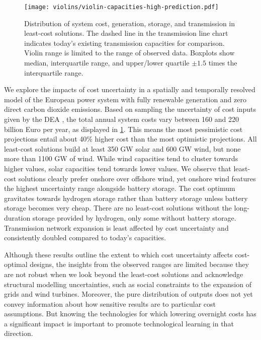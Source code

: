 
\begin{figure}
    \centering
    \texttt{[image: violins/violin-capacities-high-prediction.pdf]}
    \caption{
      Distribution of system cost, generation, storage, and transmission
      in least-cost solutions. The dashed line in the
      transmission line chart indicates today's existing transmission
      capacities for comparison. Violin range is limited to the range of observed data.
      Boxplots show median, interquartile range, and upper/lower quartile $\pm 1.5$ times the interquartile range.
    }
    \label{fig:violin}
\end{figure}

We explore the impacts of cost uncertainty in a spatially and temporally
resolved model of the European power system with fully renewable generation and
zero direct carbon dioxide emissions. Based on sampling the uncertainty of cost
inputs given by the DEA \cite{DEA}, the total annual system costs vary between
160 and 220 billion Euro per year, as displayed in \cref{fig:violin}. This means
the most pessimistic cost projections entail about 40\% higher cost than the
most optimistic projections. All least-cost solutions build at least 350 GW
solar and 600 GW wind, but none more than 1100 GW of wind. While wind capacities
tend to cluster towards higher values, solar capacities tend towards lower
values. We observe that least-cost solutions clearly prefer onshore over
offshore wind, yet onshore wind features the highest uncertainty range alongside
battery storage. The cost optimum gravitates towards hydrogen storage rather
than battery storage unless battery storage becomes very cheap. There are no
least-cost solutions without the long-duration storage provided by hydrogen,
only some without battery storage. Transmission network expansion is least
affected by cost uncertainty and consistently doubled compared to today's
capacities.

Although these results outline the extent to which cost uncertainty affects
cost-optimal designs, the insights from the observed ranges are limited because
they are not robust when we look beyond the least-cost solutions and acknowledge
structural modelling uncertainties, such as social constraints to the expansion
of grids and wind turbines. Moreover, the pure distribution of outputs does not
yet convey information about how sensitive results are to particular cost
assumptions. But knowing the technologies for which lowering overnight costs has
a significant impact is important to promote technological learning in that
direction.

